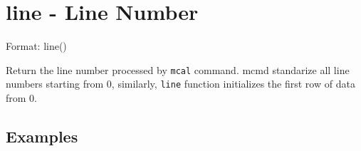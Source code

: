 
%

\section{line - Line Number\label{sect:line}}

Format: line()

Return the line number processed by \verb|mcal| command. 
mcmd standarize all line numbers starting from 0, similarly, \verb|line| function initializes the first row of data from 0.  


\subsection*{Examples}


%

